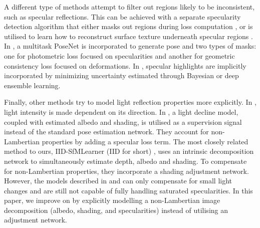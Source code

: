 A different type of methods attempt to filter out regions likely to be inconsistent, such as specular reflections. This can be achieved with a separate specularity detection algorithm that either masks out regions during loss computation \cite{li2023endodepthl,yue2023tcl}, or is utilised to learn how to reconstruct surface texture underneath specular regions \cite{wu2023unleashing}. In \cite{liao2024self}, a multitask PoseNet is incorporated to generate pose and two types of masks: one for photometric loss focused on specularities and another for geometric consistency loss focused on deformations. In \cite{rodriguez2022uncertain}, specular highlights are implicitly incorporated by minimizing uncertainty estimated through Bayesian or deep ensemble learning.


Finally, other methods try to model light reflection properties more explicitly. In \cite{wang2023surface}, light intensity is made dependent on its direction. In , a light decline model, coupled with estimated albedo and shading, is utilised as a supervision signal instead of the standard pose estimation network. They account for non-Lambertian properties by adding a specular loss term. The most closely related method to ours, IID-SfMLearner (IID for short) \cite{li2024image}, uses an intrinsic decomposition network to simultaneously estimate depth, albedo and shading.  To compensate for non-Lambertian properties, they incorporate a shading adjustment network. However, the models described in \cite{li2024image} and \cite{rodriguez2023lightdepth} can only compensate for small light changes and are still not capable of fully handling saturated specularities. In this paper, we improve on \cite{li2024image} by explicitly modelling a non-Lambertian image decomposition (albedo, shading, and specularities) instead of utilising an adjustment network.

